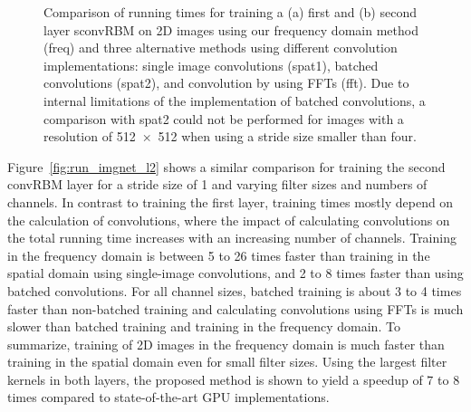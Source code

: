 \begin{figure}[t!]


\label{fig:run_imgnet}
\caption{Comparison of running times for training a (a) first and
(b) second layer sconvRBM on 2D images using our frequency domain method (freq) and three
alternative methods using different convolution implementations: single image
convolutions (spat1), batched convolutions (spat2), and convolution by using
FFTs (fft). Due to internal limitations of the implementation of batched
convolutions, a comparison with spat2 could not be performed for images with a
resolution of \num{512x512} when using a stride size smaller than four.}
\end{figure}

Figure~\ref{fig:run_imgnet_l2} shows a similar comparison for training the
second convRBM layer for a stride size of 1 and varying filter sizes and numbers
of channels. In contrast to training the first layer, training times mostly
depend on the calculation of convolutions, where the impact of calculating
convolutions on the total running time increases with an increasing number of
channels. Training in the frequency domain is between 5 to 26 times faster than
training in the spatial domain using single-image convolutions, and 2
to 8 times faster than using batched convolutions. For all channel sizes,
batched training is about 3 to 4 times faster than non-batched training and
calculating convolutions using FFTs is much slower than batched training and
training in the frequency domain. To summarize, training of 2D images in the
frequency domain is much faster than training in the spatial domain even for
small filter sizes.
Using the largest filter kernels in both layers, the proposed method is shown to
yield a speedup of 7 to 8 times compared to state-of-the-art GPU
implementations.

